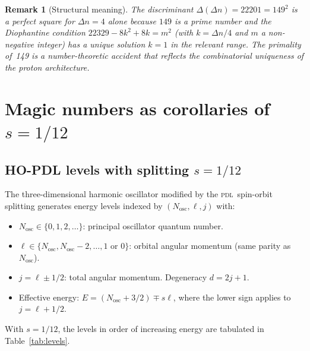 \documentclass[12pt,a4paper]{article}
\newtheorem{remark}[theorem]{Remark}
\newcommand{\PDL}{\textsc{pdl}}
\newcommand{\Dn}{\Delta n}
\begin{document}
\begin{remark}[Structural meaning]
The discriminant $\Delta(\Dn) = 22201 = 149^2$ is a perfect square for $\Dn = 4$ alone because $149$ is a prime number and the Diophantine condition $22329 - 8k^2 + 8k = m^2$ (with $k = \Dn/4$ and $m$ a non-negative integer) has a unique solution $k = 1$ in the relevant range. The primality of~149 is a number-theoretic accident that reflects the combinatorial uniqueness of the proton architecture.
\end{remark}

\section{Magic numbers as corollaries of \texorpdfstring{$s = 1/12$}{s = 1/12}}
\label{sec:magic}

\subsection{HO-PDL levels with splitting \texorpdfstring{$s = 1/12$}{s = 1/12}}

The three-dimensional harmonic oscillator modified by the \PDL\ spin-orbit splitting generates energy levels indexed by $(N_{\mathrm{osc}}, \ell, j)$ with:
\begin{itemize}
\item $N_{\mathrm{osc}} \in \{0, 1, 2, \ldots\}$: principal oscillator quantum number.
\item $\ell \in \{N_{\mathrm{osc}}, N_{\mathrm{osc}}-2, \ldots, 1 \text{ or } 0\}$: orbital angular momentum (same parity as $N_{\mathrm{osc}}$).
\item $j = \ell \pm 1/2$: total angular momentum. Degeneracy $d = 2j+1$.
\item Effective energy: $E = (N_{\mathrm{osc}} + 3/2) \mp s\ell$, where the lower sign applies to $j = \ell + 1/2$.
\end{itemize}

With $s = 1/12$, the levels in order of increasing energy are tabulated in Table~\ref{tab:levels}.
\end{document}
